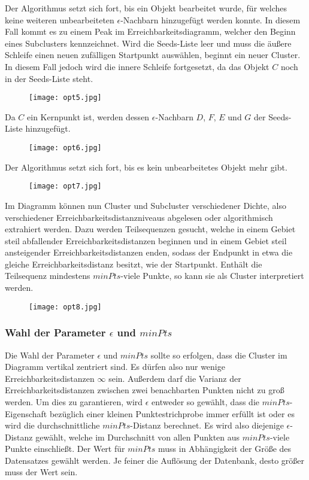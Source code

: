 \documentclass[11pt,ceqn]{book}
\begin{document}
Der Algorithmus setzt sich fort, bis ein Objekt bearbeitet wurde, für welches keine weiteren unbearbeiteten $\epsilon$-Nachbarn hinzugefügt werden konnte. In diesem Fall kommt es zu einem Peak im Erreichbarkeitsdiagramm, welcher den Beginn eines Subclusters kennzeichnet. Wird die Seeds-Liste leer und muss die äußere Schleife einen neuen zufälligen Startpunkt auswählen, beginnt ein neuer Cluster. 
In diesem Fall jedoch wird die innere Schleife fortgesetzt, da das Objekt $C$ noch in der Seeds-Liste steht.
\begin{figure}[H]
\centering
\texttt{[image: opt5.jpg]}
\end{figure}
Da $C$ ein Kernpunkt ist, werden dessen $\epsilon$-Nachbarn $D$, $F$, $E$ und $G$ der Seeds-Liste hinzugefügt. 
\begin{figure}[H]
\centering
\texttt{[image: opt6.jpg]}
\end{figure}
Der Algorithmus setzt sich fort, bis es kein unbearbeitetes Objekt mehr gibt.
\begin{figure}[H]
\centering
\texttt{[image: opt7.jpg]}
\end{figure}
Im Diagramm können nun Cluster und Subcluster verschiedener Dichte, also verschiedener Erreichbarkeitsdistanzniveaus abgelesen oder algorithmisch extrahiert werden. Dazu werden Teilsequenzen gesucht, welche in einem Gebiet steil abfallender Erreichbarkeitsdistanzen beginnen und in einem Gebiet steil ansteigender Erreichbarkeitsdistanzen enden, sodass der Endpunkt in etwa die gleiche Erreichbarkeitsdistanz besitzt, wie der Startpunkt. Enthält die Teilsequenz mindestens $minPts$-viele Punkte, so kann sie als Cluster interpretiert werden. 
\begin{figure}[H]
\centering
\texttt{[image: opt8.jpg]}
\end{figure}

\subsubsection{Wahl der Parameter $\epsilon$ und $minPts$}
Die Wahl der Parameter $\epsilon$ und $minPts$ sollte so erfolgen, dass die Cluster im Diagramm vertikal zentriert sind. Es dürfen also nur wenige Erreichbarkeitsdistanzen $\infty$ sein. Außerdem darf die Varianz der Erreichbarkeitsdistanzen zwischen zwei benachbarten Punkten nicht zu groß werden. Um dies zu garantieren, wird $\epsilon$ entweder so gewählt, dass die $minPts$-Eigenschaft bezüglich einer kleinen Punktestrichprobe immer erfüllt ist oder es wird die durchschnittliche $minPts$-Distanz berechnet. Es wird also diejenige $\epsilon$-Distanz gewählt, welche im Durchschnitt von allen Punkten aus $minPts$-viele Punkte einschließt.
Der Wert für $minPts$ muss in Abhängigkeit der Größe des Datensatzes gewählt werden. Je feiner die Auflösung der Datenbank, desto größer muss der Wert sein.
\end{document}

